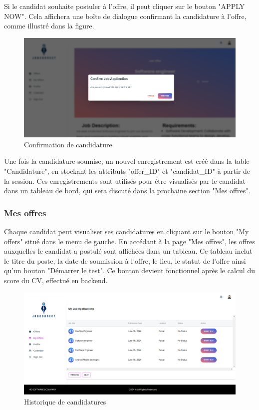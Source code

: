 Si le candidat souhaite postuler à l'offre, il peut cliquer sur le  bouton "APPLY NOW". Cela affichera une boîte de dialogue confirmant la candidature à l'offre, comme illustré dans la figure.
\newline
\begin{figure}[htbp]
   \centering
   \includegraphics[scale=0.2]{screens/confirmJob2.png} 
   \caption{Confirmation de candidature}
   \label{fig:listOffers}
\end{figure}
Une fois la candidature soumise, un nouvel enregistrement est créé dans la table "Candidature", en stockant les attributs "offer_ID"  et  "candidat_ID"  à partir de la session.
Ces enregistrements sont utilisés pour être visualisés par le candidat dans un tableau de bord, qui sera discuté dans  la prochaine section "Mes offres".

\subsubsection{Mes offres}
Chaque candidat peut visualiser ses candidatures en cliquant sur le bouton "My offers" situé dans le  menu de  gauche. En accédant à la page "Mes offres", les  offres auxquelles le  candidat a postulé sont affichées dans un tableau. Ce  tableau inclut le titre du poste, la date de  soumission à l'offre, le  lieu, le  statut de  l’offre ainsi qu'un bouton "Démarrer le test". Ce  bouton devient fonctionnel après le calcul du score du CV, effectué en backend. 
\begin{figure}[htbp]
   \centering
   \includegraphics[scale=0.3]{screens/myOffers.png} 
   \caption{Historique de candidatures}
   \label{fig:listOffers}
\end{figure}

